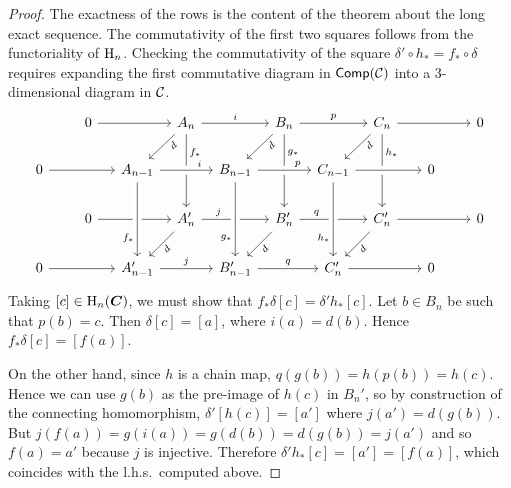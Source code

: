 \begin{proof}
     The exactness of the rows is the content of the theorem about the long exact sequence. The commutativity of the first two squares follows from the functoriality of $\mathrm{H}_n$. Checking the commutativity of the square $\delta'\circ h_\ast=f_\ast\circ \delta$ requires expanding the first commutative diagram in $\mathsf{Comp}(\mathcal{C})$ into a 3-dimensional diagram in $\mathcal{C}$.
     \[
     \begin{tikzcd}[column sep={35,between origins}]
        &
        0 
        \ar{rr}
        & &
        A_n
        \ar{dl}[swap, sloped, near start]{d}
        \ar{rr}{i}
        \ar[]{dd}[near start]{f_\ast}
        & & B_n
        \ar{dd}[near start]{g_\ast}
        \ar{rr}{p}
        \ar{dl}[swap, sloped, near start]{d}
        & & C_n
        \ar{dd}[near start]{h_\ast}
        \ar{dl}[swap, sloped, near start]{d}
        \ar{rr}
        & &
        0
        \\
        0
        \ar{rr}
        & &
        A_{n-1}
        \ar[crossing over]{rr}[near end]{i}
        & & B_{n-1}
        \ar[crossing over]{rr}[near end]{p}
        & & C_{n-1}
        \ar[crossing over]{rr}
        & &
        0
        \\
        &
        0
        \ar{rr}
        & &
        A_n'
        \ar[near start]{rr}{j}
        \ar[sloped, swap]{dl}{d}
        & & B_n'
        \ar[near start]{rr}{q}
        \ar[sloped, swap]{dl}{d}
        & & C_n'
        \ar[sloped, swap]{dl}{d}
        \ar{rr}
        & &
        0
        \\
        0
        \ar{rr}
        & &
        A_{n-1}'
        \ar{rr}{j}
        \ar[crossing over, leftarrow, near start]{uu}{f_\ast}
        & & B_{n-1}'
        \ar{rr}{q}
        \ar[crossing over, leftarrow, near start]{uu}{g_\ast}
        & & C_n'
        \ar[crossing over, leftarrow, near start]{uu}{h_\ast}
        \ar{rr}
        & &
        0
        \end{tikzcd}
     \]
     Taking $[c]\in \mathrm{H}_n(\boldsymbol{C})$, we must show that $f_\ast\delta [c]=\delta ' h_\ast [c]$. Let $b\in B_n$ be such that $p(b)=c$. Then $\delta [c]=[a]$, where $i(a)=d(b)$. Hence $f_\ast \delta [c]=[f(a)]$. 
     
     On the other hand, since $h$ is a chain map, $q(g(b))=h(p(b))=h(c)$. Hence we can use $g(b)$ as the pre-image of $h(c)$ in $B_n'$, so by construction of the connecting homomorphism, $\delta '[h(c)]=[a']$ where $j(a')=d(g(b))$. But $j(f(a))=g(i(a))=g(d(b))=d(g(b))=j(a')$ and so $f(a)=a'$ because $j$ is injective. Therefore $\delta'h_\ast [c]=[a']=[f(a)]$, which coincides with the l.h.s.\ computed above.
\end{proof}

